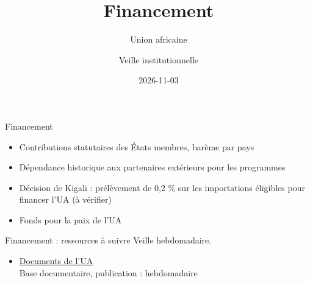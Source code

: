 \documentclass[aspectratio=169,11pt]{beamer}
\title{Financement}
\subtitle{Union africaine}
\author{Veille institutionnelle}
\date{2026-11-03}
\begin{document}
\begin{frame}\titlepage\end{frame}

\begin{frame}{Financement}
\begin{itemize}
\item Contributions statutaires des États membres, barème par pays
\item Dépendance historique aux partenaires extérieurs pour les programmes
\item Décision de Kigali : prélèvement de 0,2 \% sur les importations éligibles pour financer l'UA (à vérifier)
\item Fonds pour la paix de l'UA
\end{itemize}
\end{frame}

\begin{frame}{Financement : ressources à suivre}
\small
Veille hebdomadaire.
\begin{itemize}
\item \href{https://au.int/en/documents}{Documents de l'UA}\\{\footnotesize Base documentaire, publication : hebdomadaire}
\end{itemize}
\end{frame}
\end{document}
